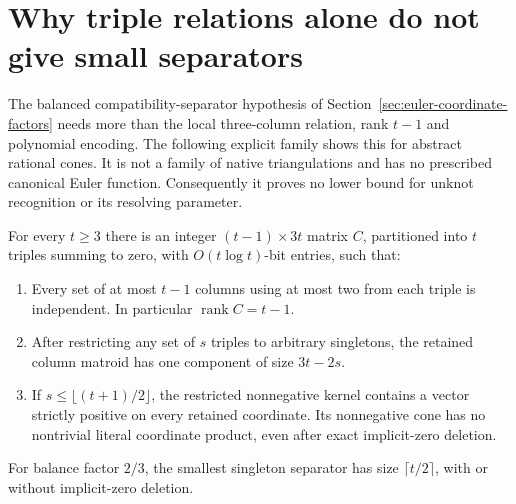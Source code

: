 \section{Why triple relations alone do not give small separators}
\label{sec:coordinate-separator-obstruction}

The balanced compatibility-separator hypothesis of
Section~\ref{sec:euler-coordinate-factors} needs more than the local
three-column relation, rank $t-1$ and polynomial encoding.  The following
explicit family shows this for abstract rational cones.  It is not a family
of native triangulations and has no prescribed canonical Euler function.
Consequently it proves no lower bound for unknot recognition or its resolving
parameter.

\begin{proposition}
For every $t\ge3$ there is an integer $(t-1)\times3t$ matrix $C$, partitioned
into $t$ triples summing to zero, with $O(t\log t)$-bit entries, such that:
\begin{enumerate}
\item Every set of at most $t-1$ columns using at most two from each triple
is independent.  In particular $\operatorname{rank}C=t-1$.
\item After restricting any set of $s$ triples to arbitrary singletons,
the retained column matroid has one component of size $3t-2s$.
\item If $s\le\lfloor(t+1)/2\rfloor$, the restricted nonnegative kernel
contains a vector strictly positive on every retained coordinate.  Its
nonnegative cone has no nontrivial literal coordinate product, even after
exact implicit-zero deletion.
\end{enumerate}
For balance factor $2/3$, the smallest singleton separator has size
$\lceil t/2\rceil$, with or without implicit-zero deletion.
\end{proposition}

